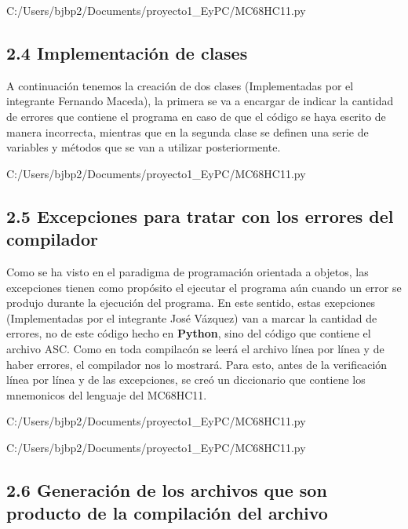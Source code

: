\documentclass[letterpaper]{report}
\begin{document}
    
    {C:/Users/bjbp2/Documents/proyecto1_EyPC/MC68HC11.py}

    \subsection*{2.4 Implementaci\'on de clases}
    A continuaci\'on tenemos la creaci\'on de dos clases (Implementadas por el 
    integrante Fernando Maceda), la primera se va a encargar de indicar
    la cantidad de errores que contiene el programa en caso de que el c\'odigo
    se haya escrito de manera incorrecta, mientras que en la segunda clase se 
    definen una serie de variables y m\'etodos que se van a utilizar posteriormente.

    
    {C:/Users/bjbp2/Documents/proyecto1_EyPC/MC68HC11.py}
    \subsection*{2.5 Excepciones para tratar con los errores del compilador}
    Como se ha visto en el paradigma de programaci\'on orientada a objetos, las
    excepciones tienen como prop\'osito el ejecutar el programa a\'un cuando un
    error se produjo durante la ejecuci\'on del programa.
    En este sentido, estas exepciones (Implementadas por el integrante Jos\'e 
    V\'azquez) van a marcar la cantidad de errores, no de este c\'odigo hecho en 
    \textbf{Python}, sino del c\'odigo que contiene el archivo ASC.
    Como en toda compilac\'on se leer\'a el archivo l\'inea por l\'inea y de haber
    errores, el compilador nos lo mostrar\'a. Para esto, antes de la verificaci\'on
    línea por línea y de las excepciones, se cre\'o un diccionario que contiene los
    mnemonicos del lenguaje del MC68HC11.

    
    {C:/Users/bjbp2/Documents/proyecto1_EyPC/MC68HC11.py}

    
    {C:/Users/bjbp2/Documents/proyecto1_EyPC/MC68HC11.py}

    \subsection*{2.6 Generación de los archivos
    que son producto de la compilación del archivo}
\end{document}
